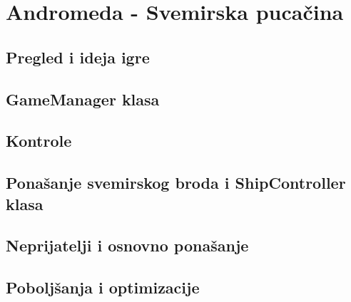 \clearpage
\section{Andromeda - Svemirska puca\v{c}ina}
\label{sec:Section_Name_X}

\subsection{Pregled i ideja igre}

\subsection{GameManager klasa}

\subsection{Kontrole}

\subsection{Pona\v{s}anje svemirskog broda i ShipController klasa}

\subsection{Neprijatelji i osnovno pona\v{s}anje}

\subsection{Pobolj\v{s}anja i optimizacije}